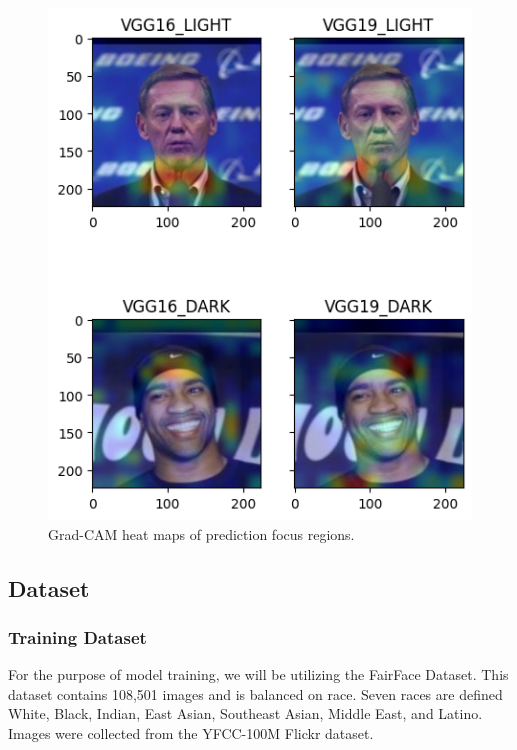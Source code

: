 \documentclass[conference]{IEEEtran}
\begin{document}
\begin{figure}[hbt!]
    \centerline{\includegraphics[width=0.8\linewidth]{latex/images/heatmap.png}}
    \caption{Grad-CAM heat maps of prediction focus regions.}
    \label{grad_cam}
\end{figure}

\subsection{Dataset}
\subsubsection{Training Dataset}
For the purpose of model training, we will be utilizing the FairFace Dataset\cite{karkkainen2021fairface}. This dataset contains 108,501 images and is balanced on race. Seven races are defined White, Black, Indian, East Asian, Southeast Asian, Middle East, and Latino. Images were collected from the YFCC-100M Flickr dataset\cite{thomee2016yfcc100m}.
\end{document}
